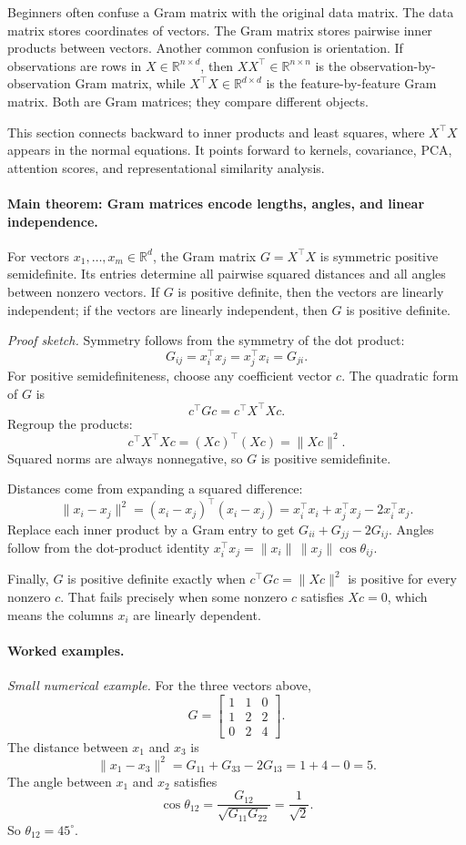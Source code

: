 Beginners often confuse a Gram matrix with the original data matrix. The data matrix stores coordinates of vectors. The Gram matrix stores pairwise inner products between vectors. Another common confusion is orientation. If observations are rows in \(X\in\mathbb{R}^{n\times d}\), then \(XX^\top\in\mathbb{R}^{n\times n}\) is the observation-by-observation Gram matrix, while \(X^\top X\in\mathbb{R}^{d\times d}\) is the feature-by-feature Gram matrix. Both are Gram matrices; they compare different objects.

This section connects backward to inner products and least squares, where \(X^\top X\) appears in the normal equations. It points forward to kernels, covariance, PCA, attention scores, and representational similarity analysis.

\paragraph{Main theorem: Gram matrices encode lengths, angles, and linear independence.}
For vectors \(x_1,\dots,x_m\in\mathbb{R}^d\), the Gram matrix \(G=X^\top X\) is symmetric positive semidefinite. Its entries determine all pairwise squared distances and all angles between nonzero vectors. If \(G\) is positive definite, then the vectors are linearly independent; if the vectors are linearly independent, then \(G\) is positive definite.

\emph{Proof sketch.} Symmetry follows from the symmetry of the dot product:
\[
G_{ij}=x_i^\top x_j=x_j^\top x_i=G_{ji}.
\]
For positive semidefiniteness, choose any coefficient vector \(c\). The quadratic form of \(G\) is
\[
c^\top Gc=c^\top X^\top Xc.
\]
Regroup the products:
\[
c^\top X^\top Xc=(Xc)^\top(Xc)=\|Xc\|^2.
\]
Squared norms are always nonnegative, so \(G\) is positive semidefinite.

Distances come from expanding a squared difference:
\[
\|x_i-x_j\|^2
=(x_i-x_j)^\top(x_i-x_j)
=x_i^\top x_i+x_j^\top x_j-2x_i^\top x_j.
\]
Replace each inner product by a Gram entry to get \(G_{ii}+G_{jj}-2G_{ij}\). Angles follow from the dot-product identity \(x_i^\top x_j=\|x_i\|\,\|x_j\|\cos\theta_{ij}\).

Finally, \(G\) is positive definite exactly when \(c^\top Gc=\|Xc\|^2\) is positive for every nonzero \(c\). That fails precisely when some nonzero \(c\) satisfies \(Xc=0\), which means the columns \(x_i\) are linearly dependent.

\paragraph{Worked examples.}
\emph{Small numerical example.} For the three vectors above,
\[
G=
\begin{bmatrix}
1&1&0\\
1&2&2\\
0&2&4
\end{bmatrix}.
\]
The distance between \(x_1\) and \(x_3\) is
\[
\|x_1-x_3\|^2
=G_{11}+G_{33}-2G_{13}
=1+4-0=5.
\]
The angle between \(x_1\) and \(x_2\) satisfies
\[
\cos\theta_{12}
=\frac{G_{12}}{\sqrt{G_{11}G_{22}}}
=\frac{1}{\sqrt{2}}.
\]
So \(\theta_{12}=45^\circ\).

